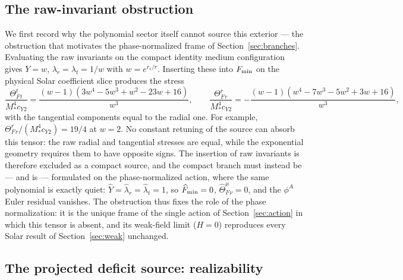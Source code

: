 \documentclass[12pt,a4paper]{article}
\begin{document}
\subsection{The raw-invariant obstruction}
\label{sec:obstruction}

We first record why the polynomial sector itself cannot source this exterior
--- the obstruction that motivates the phase-normalized frame of
Section~\ref{sec:branches}. Evaluating the raw invariants on the compact
identity medium configuration gives $Y=w$, $\lambda_r=\lambda_t=1/w$ with
$w=e^{r_s/r}$. Inserting these into $F_{\rm min}$ on the physical Solar
coefficient slice produces the stress
\[
\frac{\Theta_F^t{}_t}{M_*^4c_{Y2}}
=\frac{(w-1)(3w^4-5w^3+w^2-23w+16)}{w^3},
\qquad
\frac{\Theta_F^r{}_r}{M_*^4c_{Y2}}
=-\frac{(w-1)(w^4-7w^3-5w^2+3w+16)}{w^3},
\]
with the tangential components equal to the radial one. For example,
$\Theta_F^r{}_r/(M_*^4c_{Y2})=19/4$ at $w=2$. No constant retuning of the
source can absorb this tensor: the raw radial and tangential stresses are
equal, while the exponential geometry requires them to have opposite signs.
The insertion of raw invariants is therefore excluded as a compact source,
and the compact branch must instead be --- and is --- formulated on the
phase-normalized action, where the same polynomial is exactly quiet:
$\widehat Y=\widehat\lambda_r=\widehat\lambda_t=1$, so
$\widehat F_{\rm min}=0$, $\widehat\Theta_F^\mu{}_\nu=0$, and the $\phi^A$
Euler residual vanishes. The obstruction thus fixes the role of the phase
normalization: it is the unique frame of the single action of
Section~\ref{sec:action} in which this tensor is absent, and its weak-field
limit ($H=0$) reproduces every Solar result of Section~\ref{sec:weak}
unchanged.

\subsection{The projected deficit source: realizability}
\label{sec:realizability}
\end{document}
